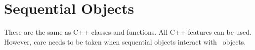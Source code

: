 \section{Sequential Objects}

These are the same as C++ classes and functions.  All C++ features can
be used.  However, care needs to be taken when sequential objects
interact with \charmpp\ objects.
